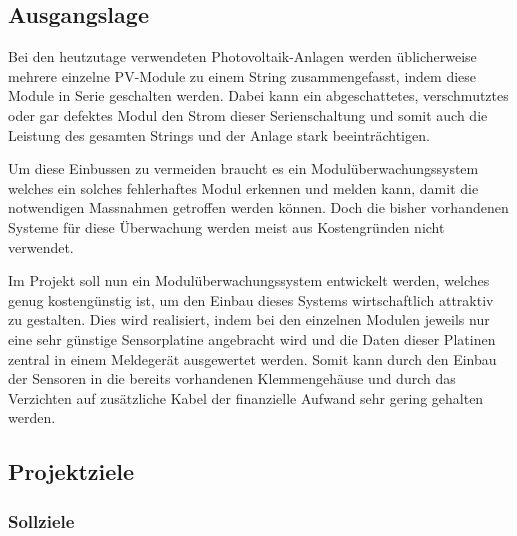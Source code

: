 \subsection{Ausgangslage}

Bei  den heutzutage  verwendeten  Photovoltaik-Anlagen werden  \"ublicherweise
mehrere einzelne PV-Module zu einem String zusammengefasst, indem diese Module
in Serie geschalten werden. Dabei  kann ein abgeschattetes, verschmutztes oder
gar  defektes  Modul den  Strom  dieser  Serienschaltung  und somit  auch  die
Leistung des gesamten Strings und der Anlage stark beeintr\"achtigen.

Um  diese  Einbussen zu  vermeiden  braucht  es ein  Modul\"uberwachungssystem
welches ein  solches fehlerhaftes  Modul erkennen und  melden kann,  damit die
notwendigen Massnahmen getroffen werden  k\"onnen. Doch die bisher vorhandenen
Systeme  f\"ur  diese \"Uberwachung  werden  meist  aus Kostengr\"unden  nicht
verwendet.

Im Projekt  soll nun ein Modul\"uberwachungssystem  entwickelt werden, welches
genug  kosteng\"unstig  ist, um   den  Einbau  dieses  Systems  wirtschaftlich
attraktiv zu gestalten. Dies wird realisiert,  indem bei den einzelnen Modulen
jeweils nur eine  sehr g\"unstige Sensorplatine angebracht wird  und die Daten
dieser Platinen  zentral in einem Meldeger\"at  ausgewertet werden. Somit kann
durch den Einbau der Sensoren  in die bereits vorhandenen Klemmengeh\"ause und
durch  das Verzichten  auf zus\"atzliche  Kabel der  finanzielle Aufwand  sehr
gering gehalten werden.


\subsection{Projektziele}

\subsubsection{Sollziele}

